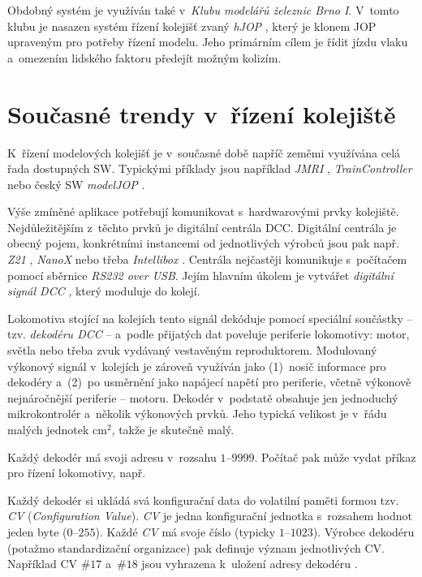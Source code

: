 Obdobný systém je využíván také v~\textit{Klubu modelářů železnic Brno I}.
V~tomto klubu je nasazen systém řízení kolejišť zvaný \textit{hJOP}
\cite{hjop:web}, který je klonem \gls{JOP} upraveným pro potřeby řízení modelu.
Jeho primárním cílem je řídit jízdu vlaku a~omezením lidského faktoru předejít
možným kolizím.

\section{Současné trendy v~řízení kolejiště}
\label{sec:trendy}

K~řízení modelových kolejišť je v~současné době napříč zeměmi využívána celá
řada dostupných SW. Typickými příklady jsou například \textit{JMRI}
\cite{jmri:web}, \textit{TrainController} \cite{traincontroller:web}
nebo český SW \textit{modelJOP} \cite{modeljop:web}.

Výše zmíněné aplikace potřebují komunikovat s~hardwarovými prvky kolejiště.
Nejdůležitějším z~těchto prvků je digitální centrála \gls{DCC}. Digitální
centrála je obecný pojem, konkrétními instancemi od jednotlivých výrobců jsou
pak např.  \textit{Z21} \cite{z21:web}, \textit{NanoX} \cite{nanox:web} nebo
třeba \textit{Intellibox} \cite{intellibox:web}. Centrála nejčastěji komunikuje
s~počítačem pomocí sběrnice \textit{RS232 over USB}. Jejím hlavním úkolem je
vytvářet \textit{digitální signál \gls{DCC}} \cite{nmra:dcc:ele}, který
moduluje do kolejí.

Lokomotiva stojící na kolejích tento signál dekóduje pomocí spe\-ciál\-ní
součástky -- tzv. \textit{dekodéru \gls{DCC}} -- a~podle přijatých dat poveluje
periferie lokomotivy: motor, světla nebo třeba zvuk vydávaný vestavěným
reproduktorem. Modulovaný výkonový signál v~kolejích je zároveň využíván jako
(1)~nosič informace pro dekodéry a~(2)~po usměrnění jako napájecí napětí pro
periferie, včetně výkonově nejnáročnější periferie -- motoru. Dekodér
v~podstatě obsahuje jen jednoduchý mikrokontrolér a~několik výkonových prvků.
Jeho typická velikost je v~řádu malých jednotek cm$^2$, takže je skutečně malý.

Každý dekodér má svoji adresu v~rozsahu $1$--$9999$. Počítač pak může vydat
příkaz pro řízení lokomotivy, např. \textit{}

Každý dekodér si ukládá svá konfigurační data do volatilní paměti formou tzv.
\textit{\gls{CV}} (\textit{Configuration Value}). \textit{\gls{CV}} je jedna
konfigurační jednotka s~rozsahem hodnot jeden byte ($0$--$255$). Každé
\textit{\gls{CV}} má svoje číslo (typicky $1$--$1023$). Výrobce dekodéru
(potažmo standardizační organizace) pak definuje význam jednotlivých \gls{CV}.
Například \gls{CV} $\#17$ a~$\#18$ jsou vyhrazena k~uložení adresy dekodéru
\cite{zimo:cvs}.

